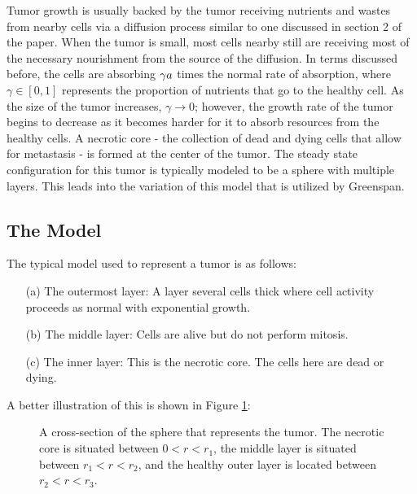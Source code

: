 \documentclass{article}
\begin{document}
Tumor growth is usually backed by the tumor receiving nutrients and wastes from nearby cells via a diffusion process similar to one discussed
in section 2 of the paper. When the tumor is small, most cells nearby still are receiving most of the necessary nourishment from the source of the
diffusion. In terms discussed before, the cells are absorbing $\gamma \* a$ times the normal rate of absorption, where $\gamma \in [0, 1]$ represents
the proportion of nutrients that go to the healthy cell. As the size of the tumor increases, $\gamma \rightarrow 0$; however, the growth rate of the tumor
begins to decrease as it becomes harder for it to absorb resources from the healthy cells. A necrotic core - the collection of dead and dying cells that allow
for metastasis - is formed at the center of the tumor. The steady state configuration for this tumor is typically modeled
to be a sphere with multiple layers. This leads into the variation of this model that is utilized by Greenspan.

\subsection{The Model}

The typical model used to represent a tumor is as follows:
\begin{enumerate}
    \item[(a)] The outermost layer: A layer several cells thick where cell activity proceeds as normal with exponential growth.
    \item[(b)] The middle layer: Cells are alive but do not perform mitosis.
    \item[(c)] The inner layer: This is the necrotic core. The cells here are dead or dying.
\end{enumerate}

A better illustration of this is shown in Figure \ref{fig:cross-section}:
\begin{figure}[ht]
    \centering
    \caption{A cross-section of the sphere that represents the tumor. The necrotic core is situated between $0 < r < r_1$,
        the middle layer is situated between $r_1 < r < r_2$, and the healthy outer layer is located between $r_2 < r < r_3$.}
    \label{fig:cross-section}
\end{figure}
\end{document}
